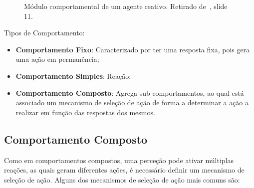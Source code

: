 \begin{figure}[H]
    \begin{center}
    \end{center}
    \caption{Módulo comportamental de um agente reativo.
    Retirado de~\cite{isel:iasa:slides:arq-agentes-reativos-parte-1}, slide 11.}\label{fig:agente-reativo-comportamento}
\end{figure}

Tipos de Comportamento:

\begin{itemize}
    \item \textbf{Comportamento Fixo}: Caracterizado por ter uma resposta fixa, pois gera uma ação em permanência;
    \item \textbf{Comportamento Simples}: Reação;
    \item \textbf{Comportamento Composto}: Agrega sub-comportamentos, ao qual está associado um mecanismo de seleção de ação de forma a determinar a ação a realizar em função das respostas dos mesmos.
\end{itemize}

\subsection{Comportamento Composto}\label{subsec:comportamento-composto}

Como em comportamentos compostos, uma perceção pode ativar múltiplas reações, as quais geram diferentes ações, é necessário definir um mecanismo de seleção de ação.
Alguns dos mecanismos de seleção de ação mais comuns são:


